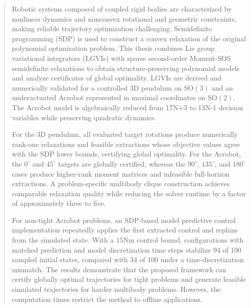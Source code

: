 \documentclass[ITR, MA, english, final]{LSR_thesis}
\begin{document}
\fi
\newpage

\phantom{u}
\begin{abstract}

Robotic systems composed of coupled rigid bodies are characterized by nonlinear dynamics 
and nonconvex rotational and geometric constraints, making reliable trajectory optimization 
challenging. Semidefinite programming (SDP) is used to construct a convex relaxation of the 
original polynomial optimization problem. This thesis combines Lie group variational 
integrators (LGVIs) with sparse 
second-order Moment-SOS semidefinite relaxations to obtain structure-preserving polynomial models 
and analyze certificates of global optimality. LGVIs are derived and numerically 
validated for a controlled 3D pendulum on $\mathrm{SO}(3)$ and an underactuated Acrobot 
represented in maximal coordinates on $\mathrm{SO}(2)$. The Acrobot model 
is algebraically reduced from 17N+3 to 
13N-1 decision variables while preserving quadratic dynamics.

For the 3D pendulum, all evaluated target rotations produce numerically rank-one relaxations 
and feasible extractions whose objective values agree with the SDP lower bounds, certifying global 
optimality. For the Acrobot, 
the $0^\circ$ and $45^\circ$ targets are globally certified, whereas the $90^\circ$, $135^\circ$, and 
$180^\circ$ cases produce higher-rank moment matrices and infeasible full-horizon extractions. A 
problem-specific multibody clique construction achieves comparable relaxation quality while reducing 
the solver runtime by a factor of approximately three to five.

For non-tight Acrobot problems, an SDP-based model predictive control implementation repeatedly 
applies the first extracted control and replans from the simulated state. With a $15\mathrm{Nm}$ 
control bound, configurations with matched prediction and model discretization time steps stabilize 94 
of 100 sampled initial states, compared with 34 of 100 under a time-discretization mismatch. 
The results demonstrate that the proposed framework can certify globally optimal trajectories for 
tight problems and generate feasible simulated trajectories for harder multibody problems. However, 
the computation times restrict the method to offline applications.



\end{abstract}
\end{document}
